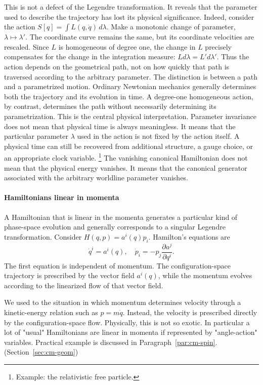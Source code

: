 This is not a defect of the Legendre transformation. It reveals that the
parameter used to describe the trajectory has lost its physical significance.
Indeed, consider the action \(S[q]=\int L(q,\dot q)\,d\lambda\).
Make a monotonic change of parameter, \(\lambda\mapsto\lambda'\). The
coordinate curve remains the same, but its coordinate velocities are rescaled.
Since \(L\) is homogeneous of degree one, the change in \(L\) precisely
compensates for the change in the integration measure:
\(L d\lambda=L' d\lambda'\).
Thus the action depends on the geometrical path, not on how quickly that path
is traversed according to the arbitrary parameter.
The distinction is between a path and a parametrized motion. Ordinary Newtonian
mechanics generally determines both the trajectory and its evolution in time. A
degree-one homogeneous action, by contrast, determines the path without
necessarily determining its parametrization. 
This is the central physical interpretation.
Parameter invariance does not mean that physical time is always meaningless. It
means that the particular parameter \(\lambda\) used in the action is not fixed
by the action itself. A physical time can still be recovered from additional
structure, a gauge choice, or an appropriate clock variable.
\footnote{ Example: the relativistic free particle.}
The vanishing canonical Hamiltonian does not mean that the physical energy
vanishes. It means that the canonical generator associated with the arbitrary
worldline parameter vanishes.
\paragraph{Hamiltonians linear in momenta}
 A Hamiltonian that is linear in the momenta generates a particular kind of
 phase-space evolution and generally corresponds to a singular Legendre
 transformation. Consider \(H(q,p)=a^i(q)p_i\).
Hamilton's equations are
\[
\dot q^i=a^i(q), \quad \dot p_i=-p_j\frac{\partial a^j}{\partial q^i}.\]
The first equation is independent of momentum. The configuration-space
trajectory is prescribed by the vector field \(a^i(q)\), while the momentum
evolves according to the linearized flow of that vector field.

We used to the situation in which momentum determines velocity through a
kinetic-energy relation such as \(p=m\dot q\). Instead, the velocity is
prescribed directly by the configuration-space flow.
Physically, this is not so exotic. In particular a lot of "usual" Hamiltonians
are linear in momenta if represented by "angle-action" variables.
Practical example is discussed in Paragraph~\ref{par:cm-spin}.
(Section~\ref{sec:cm-geom})
